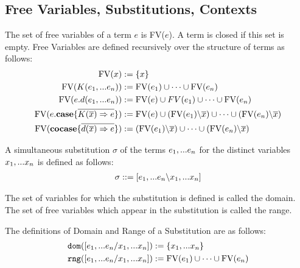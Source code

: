 \documentclass[twoside,12pt,a4paper]{article}
\begin{document}
\subsection{Free Variables, Substitutions, Contexts}

\begin{definition}
    The set of free variables of a term $e$ is FV($e$). A term is closed if this set is empty.
    Free Variables are defined recursively over the structure of terms as follows:
    \begin{align*}
        \begin{split}
            \text{FV}(x) &:= \{x\}\\
            \text{FV}(K(e_1,...e_n)) &:= \text{FV}(e_1) \cup \dots\cup \text{FV}(e_n)\\
            \text{FV}(e.d(e_1,...e_n)) &:= \text{FV}(e)\cup FV(e_1) \cup \dots \cup \text{FV}(e_n)\\
            \text{FV}(e.\textbf{case}\{\overline{K(\overline{x})\Rightarrow e}\}) &:= \text{FV}(e)\cup (\text{FV}(e_1)\backslash\overline{x})\cup \dots\cup (\text{FV}(e_n)\backslash\overline{x})\\
            \text{FV}(\textbf{cocase}\{\overline{d(\overline{x})\Rightarrow e}\}) &:= (\text{FV}(e_1)\backslash\overline{x})\cup \dots\cup (\text{FV}(e_n)\backslash\overline{x})
        \end{split}
    \end{align*}
\end{definition}


\begin{definition}[Substitution]
    A simultaneous substitution $\sigma$ of the terms $e_1,...e_n$ for the distinct variables $x_1,...x_n$ is defined as follows:
    \begin{align*} %
        \sigma ::= [\listofexpr \backslash\listofvar]
    \end{align*}
\end{definition}

The set of variables for which the substitution is defined is called the domain.
The set of free variables which appear in the substitution is called the range. %

\begin{definition}
    The definitions of Domain and Range of a Substitution are as follows:
    \begin{align*}
        \texttt{dom}([e_1,...e_n/x_1,...x_n]) &:= \{x_1,...x_n\}\\
        \texttt{rng}([e_1,...e_n/x_1,...x_n]) &:= \text{FV}(e_1)\cup \dots\cup\text{FV}(e_n)
    \end{align*}
\end{definition}
\end{document}
